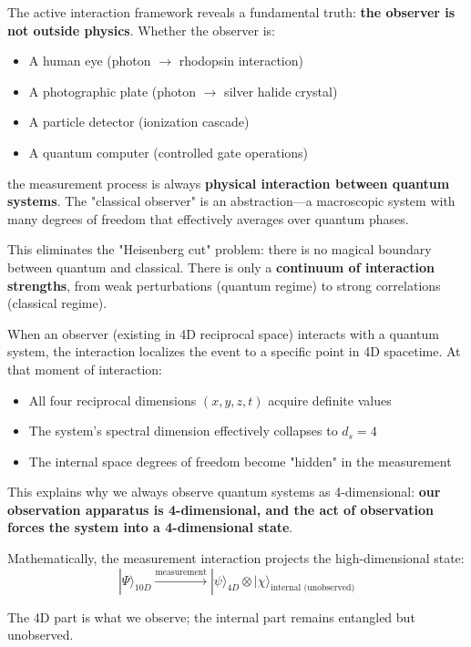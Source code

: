 \begin{insight}
The active interaction framework reveals a fundamental truth: \textbf{the observer is not outside physics}. Whether the observer is:
\begin{itemize}
    \item A human eye (photon $\to$ rhodopsin interaction)
    \item A photographic plate (photon $\to$ silver halide crystal)
    \item A particle detector (ionization cascade)
    \item A quantum computer (controlled gate operations)
\end{itemize}
the measurement process is always \textbf{physical interaction between quantum systems}. The "classical observer" is an abstraction—a macroscopic system with many degrees of freedom that effectively averages over quantum phases.

This eliminates the "Heisenberg cut" problem: there is no magical boundary between quantum and classical. There is only a \textbf{continuum of interaction strengths}, from weak perturbations (quantum regime) to strong correlations (classical regime).
\end{insight}

\begin{insight}
When an observer (existing in 4D reciprocal space) interacts with a quantum system, the interaction localizes the event to a specific point in 4D spacetime. At that moment of interaction:
\begin{itemize}
    \item All four reciprocal dimensions $(x, y, z, t)$ acquire definite values
    \item The system's spectral dimension effectively collapses to $d_s = 4$
    \item The internal space degrees of freedom become "hidden" in the measurement
\end{itemize}

This explains why we always observe quantum systems as 4-dimensional: \textbf{our observation apparatus is 4-dimensional, and the act of observation forces the system into a 4-dimensional state}.

Mathematically, the measurement interaction projects the high-dimensional state:
\begin{equation}
    |\Psi\rangle_{10D} \xrightarrow{\text{measurement}} |\psi\rangle_{4D} \otimes |\chi\rangle_{\text{internal (unobserved)}}
\end{equation}

The 4D part is what we observe; the internal part remains entangled but unobserved.
\end{insight}

